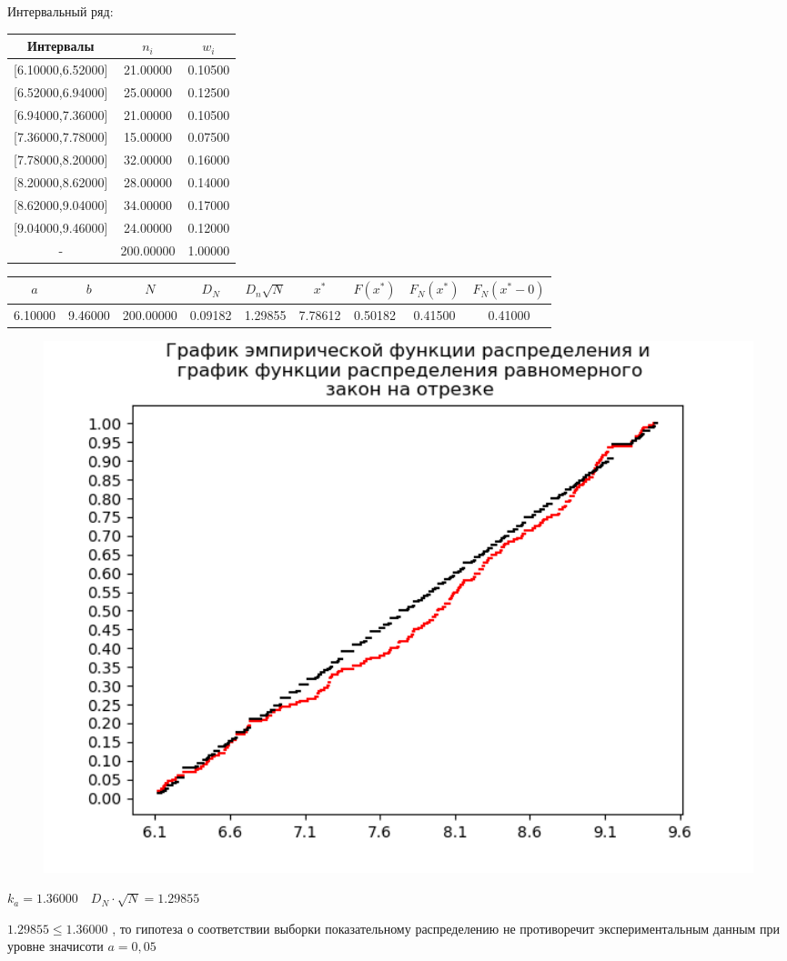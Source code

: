 \newpage%
Интервальный ряд:\newline%
\newline%
%
\begin{tabular}{|c|c|c|}%
\hline%
Интервалы&$n_i$&$w_i$\\%
\hline%
{[}6.10000,6.52000{]}&21.00000&0.10500\\%
\hline%
{[}6.52000,6.94000{]}&25.00000&0.12500\\%
\hline%
{[}6.94000,7.36000{]}&21.00000&0.10500\\%
\hline%
{[}7.36000,7.78000{]}&15.00000&0.07500\\%
\hline%
{[}7.78000,8.20000{]}&32.00000&0.16000\\%
\hline%
{[}8.20000,8.62000{]}&28.00000&0.14000\\%
\hline%
{[}8.62000,9.04000{]}&34.00000&0.17000\\%
\hline%
{[}9.04000,9.46000{]}&24.00000&0.12000\\%
\hline%
{-}&200.00000&1.00000\\%
\hline%
\end{tabular}%
\newline%
\newline%
%
\newpage%
\begin{changemargin}{-4cm}{0cm}\small{%
\begin{tabular}{|c|c|c|c|c|c|c|c|c|}%
\hline%
$a$&$b$&$N$&$D_N$&$D_n \sqrt{N}$&$x^*$&$F(x^*)$&$F_N (x^*)$&$F_N (x^* - 0)$\\%
\hline%
6.10000&9.46000&200.00000&0.09182&1.29855&7.78612&0.50182&0.41500&0.41000\\%
\hline%
\end{tabular}%
\newline%
\newline%
%
}\end{changemargin}%


\begin{figure}%
\centering%
\includegraphics[width=1.0\textwidth]{../latex/inc/generated/img/EmpAndCurDistrFunc4.png}%
\end{figure}

%
$k_a=1.36000 \quad D_N \cdot \sqrt{N}=1.29855$

%
$1.29855 \le 1.36000$%
, то гипотеза о соответствии выборки показательному распределению не противоречит экспериментальным данным при уровне значисоти $a=0,05$